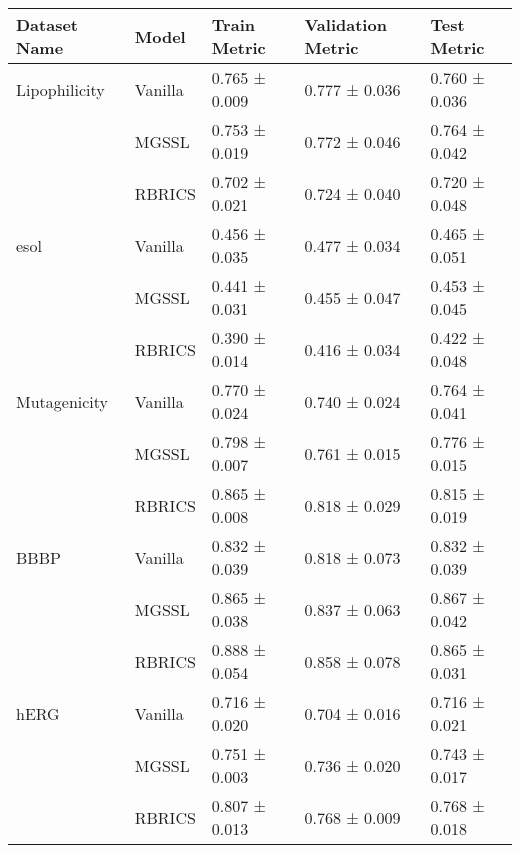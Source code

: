 \begin{tabular}{|l|l|l|l|l|}
\toprule
Dataset Name & Model & Train Metric & Validation Metric & Test Metric \\
\midrule
Lipophilicity & Vanilla & 0.765 ± 0.009 & 0.777 ± 0.036 & 0.760 ± 0.036 \\
 & MGSSL & 0.753 ± 0.019 & 0.772 ± 0.046 & 0.764 ± 0.042 \\
 & RBRICS & 0.702 ± 0.021 & 0.724 ± 0.040 & 0.720 ± 0.048 \\
esol & Vanilla & 0.456 ± 0.035 & 0.477 ± 0.034 & 0.465 ± 0.051 \\
 & MGSSL & 0.441 ± 0.031 & 0.455 ± 0.047 & 0.453 ± 0.045 \\
 & RBRICS & 0.390 ± 0.014 & 0.416 ± 0.034 & 0.422 ± 0.048 \\
Mutagenicity & Vanilla & 0.770 ± 0.024 & 0.740 ± 0.024 & 0.764 ± 0.041 \\
 & MGSSL & 0.798 ± 0.007 & 0.761 ± 0.015 & 0.776 ± 0.015 \\
 & RBRICS & 0.865 ± 0.008 & 0.818 ± 0.029 & 0.815 ± 0.019 \\
BBBP & Vanilla & 0.832 ± 0.039 & 0.818 ± 0.073 & 0.832 ± 0.039 \\
 & MGSSL & 0.865 ± 0.038 & 0.837 ± 0.063 & 0.867 ± 0.042 \\
 & RBRICS & 0.888 ± 0.054 & 0.858 ± 0.078 & 0.865 ± 0.031 \\
hERG & Vanilla & 0.716 ± 0.020 & 0.704 ± 0.016 & 0.716 ± 0.021 \\
 & MGSSL & 0.751 ± 0.003 & 0.736 ± 0.020 & 0.743 ± 0.017 \\
 & RBRICS & 0.807 ± 0.013 & 0.768 ± 0.009 & 0.768 ± 0.018 \\
\bottomrule
\end{tabular}
